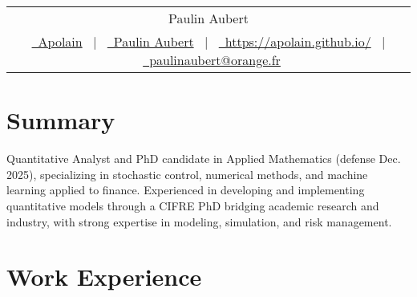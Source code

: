 \documentclass[a4paper,12pt]{article}
\begin{document}
\pagestyle{empty} 

	\begin{tabularx}{\linewidth}{@{} C @{}}
	\Huge{Paulin Aubert} \\[7.5pt]
	\href{https://github.com/apolain/}{\raisebox{-0.05\height}\faGithub\ Apolain} \ $|$ \ 
	\href{https://www.linkedin.com/in/paulinaubert/}{\raisebox{-0.05\height}\faLinkedin\ Paulin Aubert} \ $|$ \ 
	\href{https://apolain.github.io/}{\raisebox{-0.05\height}\faGlobe \ https://apolain.github.io/} \ $|$ \ 
	\href{mailto:paulinaubert@orange.fr}{\raisebox{-0.05\height}\faEnvelope \ paulinaubert@orange.fr} \\
	\end{tabularx}

	\section{Summary}
	Quantitative Analyst and PhD candidate in Applied Mathematics (defense Dec. 2025), specializing in stochastic control, numerical methods, and machine learning applied to finance.
	Experienced in developing and implementing quantitative models through a CIFRE PhD bridging academic research and industry, with strong expertise in modeling, simulation, and risk management.
	
	\section{Work Experience}
\end{document}
